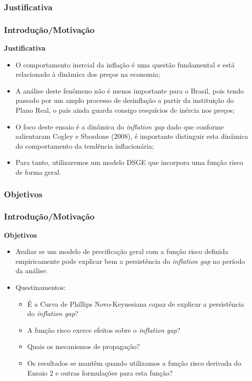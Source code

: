 \documentclass[aspectratio=169]{beamer}
\begin{document}
\subsubsection{Justificativa}

\begin{frame}\frametitle{Introdução/Motivação}
\textbf{Justificativa}
\begin{itemize}
\item O comportamento inercial da inflação é uma questão fundamental e está relacionado à dinâmica dos preços na economia;
\item A análise deste fenômeno não é menos importante para o Brasil, pois tendo passado por um amplo processo de desinflação a partir da instituição do Plano Real, o país ainda guarda consigo resquícios de inércia nos preços;
\item O foco deste ensaio é a dinâmica do \emph{inflation gap} dado que conforme salientaram Cogley e Sbordone (2008), é importante distinguir esta dinâmica do comportamento da tendência inflacionária;
\item Para tanto, utilizaremos um modelo DSGE que incorpora uma função risco de forma geral.
\end{itemize}
\end{frame}

\subsubsection{Objetivos}

\begin{frame}\frametitle{Introdução/Motivação}
\textbf{Objetivos}
\begin{itemize}
\item Avaliar se um modelo de precificação geral com a função risco definida empiricamente pode explicar bem a persistência do \emph{inflation gap} no período da análise:
\item Questinamentos:
  \begin{itemize}
  \item É a Curva de Phillips Novo-Keynesiana capaz de explicar a persistência do \emph{inflation gap}?
  \item A função risco exerce efeitos sobre o \emph{inflation gap}?
  \item Quais os mecanismos de propagação?
  \item Os resultados se mantêm quando utilizamos a função risco derivada do Ensaio 2 e outras formulações para esta função?
  \end{itemize}
\end{itemize}
\end{frame}
\end{document}
